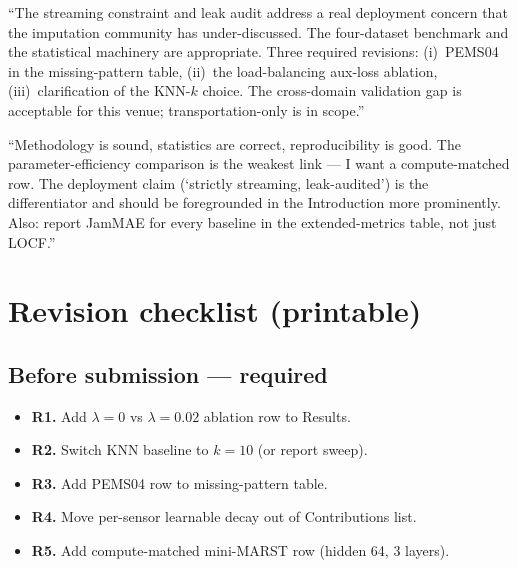 \documentclass[11pt]{article}
\begin{document}
\begin{tcolorbox}[reviewerbox, title=TRC reviewer]
``The streaming constraint and leak audit address a real deployment
concern that the imputation community has under-discussed.  The
four-dataset benchmark and the statistical machinery are appropriate.
Three required revisions: (i)~PEMS04 in the missing-pattern table,
(ii)~the load-balancing aux-loss ablation, (iii)~clarification of the
KNN-$k$ choice.  The cross-domain validation gap is acceptable for
this venue; transportation-only is in scope.''
\end{tcolorbox}

\begin{tcolorbox}[reviewerbox, title=IEEE T-ITS reviewer]
``Methodology is sound, statistics are correct, reproducibility is
good.  The parameter-efficiency comparison is the weakest link --- I
want a compute-matched row.  The deployment claim (`strictly
streaming, leak-audited') is the differentiator and should be
foregrounded in the Introduction more prominently.  Also: report
JamMAE for every baseline in the extended-metrics table, not just
LOCF.''
\end{tcolorbox}

\section{Revision checklist (printable)}

\subsection*{Before submission --- required}
\begin{itemize}
\item[\fbox{\phantom{X}}] \textbf{R1.} Add $\lambda = 0$ vs
       $\lambda = 0.02$ ablation row to Results.
\item[\fbox{\phantom{X}}] \textbf{R2.} Switch KNN baseline to $k = 10$
       (or report sweep).
\item[\fbox{\phantom{X}}] \textbf{R3.} Add PEMS04 row to
       missing-pattern table.
\item[\fbox{\phantom{X}}] \textbf{R4.} Move per-sensor learnable decay
       out of Contributions list.
\item[\fbox{\phantom{X}}] \textbf{R5.} Add compute-matched mini-MARST
       row (hidden 64, 3 layers).
\end{itemize}
\end{document}
